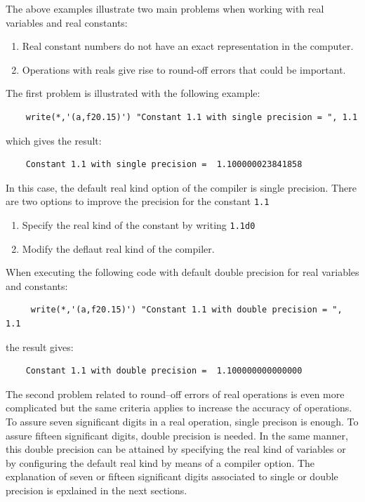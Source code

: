 The above examples illustrate two main problems when working with real variables and real constants: 
\begin{enumerate} 
\setlength\itemsep{0.1cm}
\item Real constant numbers do not have an exact representation in the computer. 
\item Operations with reals give rise to round-off errors that could be important. 
\end{enumerate}
The first problem is illustrated with the following example: 
\begin{verbatim}
    write(*,'(a,f20.15)') "Constant 1.1 with single precision = ", 1.1    
\end{verbatim}
which gives the result:  
\begin{verbatim}
    Constant 1.1 with single precision =  1.100000023841858   
\end{verbatim}
In this case, the default real kind option of the compiler is single precision. 
There are two options to improve the  precision for the constant \texttt{1.1}
\begin{enumerate} 
\setlength\itemsep{-0.1cm}
\item Specify the real kind of the constant by writing \texttt{1.1d0} 
\item Modify the deflaut real kind of the compiler. 
\end{enumerate}
When executing the following code  with default  double precision for real variables and constants:
\begin{verbatim}
     write(*,'(a,f20.15)') "Constant 1.1 with double precision = ", 1.1    
\end{verbatim}
the result gives: 
\begin{verbatim}
    Constant 1.1 with double precision =  1.100000000000000   
\end{verbatim}

The second problem related to round--off errors of real operations is even more complicated
but the same criteria applies to increase the accuracy of operations.  To assure seven 
significant digits in a real operation, single precison is enough. To assure fifteen significant digits,
double precision is needed. In the same manner, this double precision can be attained by specifying the 
real kind of variables or by configuring the default real kind by means of a compiler option.  
The explanation of seven or fifteen significant digits associated to  single or double precision 
is epxlained in the next sections. 


